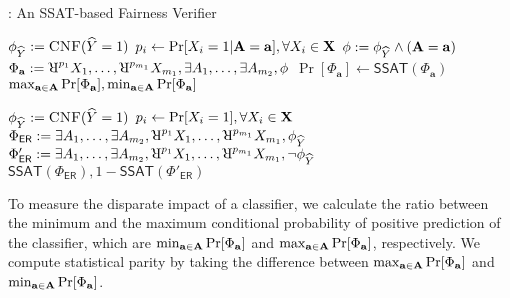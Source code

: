 \begin{algorithm}[t!]
	\caption{\justicia: An SSAT-based Fairness Verifier}
	\label{fairness_justicia_algo:enum}
	\begin{algorithmic}[1]
		\label{fairness_justicia_algo:justicia_enum_begin}
		\State $ \phi_{\widehat{Y}} := \textsc{CNF}(\widehat{Y} = 1) $
		\State $ p_{i} \leftarrow \Pr[X_i = 1|\mathbf{A} = \mathbf{a}], \forall X_i \in \mathbf{X} $
		\State $ \phi := \phi_{\widehat{Y}} \wedge (\mathbf{A} =\mathbf{a}) $
		\State $  \Phi_\mathbf{a} := \R^{p_{1}}X_1, \dots, \R^{p_{\numnonsensitive}}X_{\numnonsensitive}, \exists A_1,\dots, \exists A_{\numsensitive},  \phi $
		\State $ \Pr[\Phi_\mathbf{a}]  \leftarrow \mathsf{SSAT}(\Phi_\mathbf{a}) $ 
		\EndFor
		\Return $ \max_{\mathbf{a} \in \mathbf{A}} \Pr[\Phi_{\mathbf{a}}], \min_{\mathbf{a} \in \mathbf{A}} \Pr[\Phi_{\mathbf{a}}] $
		\label{fairness_justicia_algo:justicia_enum_end}
		\EndFunction
		\Statex
		
		
		
		\label{fairness_justicia_algo:justicia_learn_begin}
		\State $ \phi_{\widehat{Y}} := \textsc{CNF}(\widehat{Y}  = 1) $
		\State $ p_{i} \leftarrow \Pr[X_i=1], \forall X_i \in \mathbf{X} $
		\State $  \Phi_\mathsf{ER} := \exists A_1,\dots, \exists A_{\numsensitive}, \R^{p_{1}}X_1, \dots, \R^{p_{\numnonsensitive}}X_{\numnonsensitive}, \phi_{\widehat{Y}} $
		\State $  \Phi'_\mathsf{ER} := \exists A_1,\dots, \exists A_{\numsensitive}, \R^{p_{1}}X_1, \dots, \R^{p_{\numnonsensitive}}X_{\numnonsensitive}, \neg \phi_{\widehat{Y}} $
		\Return $ \mathsf{SSAT}(\Phi_\mathsf{ER}), 1 - \mathsf{SSAT}(\Phi'_\mathsf{ER}) $
		\label{fairness_justicia_algo:justicia_learn_end}
		\EndFunction
	\end{algorithmic}

\end{algorithm}


To measure the disparate impact of a classifier, we calculate the ratio between the minimum and the maximum conditional probability of positive prediction of the classifier, which are  $ \min_{\mathbf{a} \in \mathbf{A}} \Pr[\Phi_{\mathbf{a}}] $ and $ \max_{\mathbf{a} \in \mathbf{A}} \Pr[\Phi_{\mathbf{a}}] $, respectively. We compute statistical parity by taking the difference between $ \max_{\mathbf{a} \in \mathbf{A}} \Pr[\Phi_{\mathbf{a}}] $ and $ \min_{\mathbf{a} \in \mathbf{A}} \Pr[\Phi_{\mathbf{a}}] $. 


